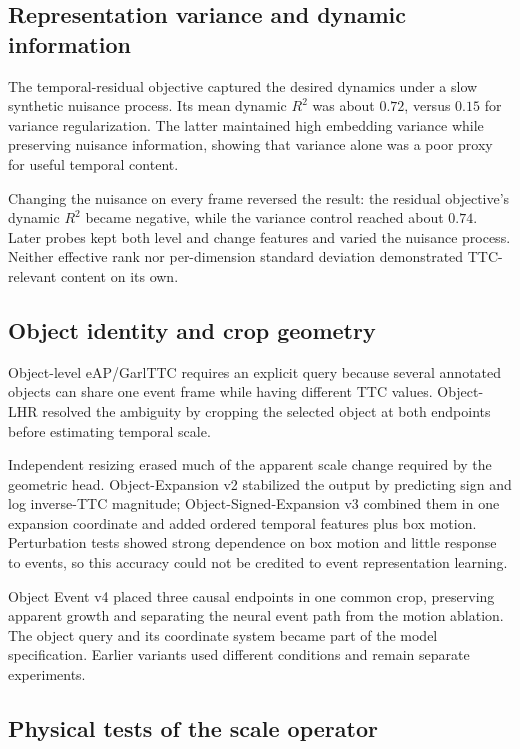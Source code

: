 \subsection{Representation variance and dynamic information}

The temporal-residual objective captured the desired dynamics under a slow synthetic nuisance process. Its mean dynamic $R^2$ was about $0.72$, versus $0.15$ for variance regularization. The latter maintained high embedding variance while preserving nuisance information, showing that variance alone was a poor proxy for useful temporal content.

Changing the nuisance on every frame reversed the result: the residual objective's dynamic $R^2$ became negative, while the variance control reached about $0.74$. Later probes kept both level and change features and varied the nuisance process. Neither effective rank nor per-dimension standard deviation demonstrated TTC-relevant content on its own. 

\subsection{Object identity and crop geometry}

Object-level eAP/GarlTTC requires an explicit query because several annotated objects can share one event frame while having different TTC values. Object-LHR resolved the ambiguity by cropping the selected object at both endpoints before estimating temporal scale.

Independent resizing erased much of the apparent scale change required by the geometric head. Object-Expansion v2 stabilized the output by predicting sign and log inverse-TTC magnitude; Object-Signed-Expansion v3 combined them in one expansion coordinate and added ordered temporal features plus box motion. Perturbation tests showed strong dependence on box motion and little response to events, so this accuracy could not be credited to event representation learning.

Object Event v4 placed three causal endpoints in one common crop, preserving apparent growth and separating the neural event path from the motion ablation. The object query and its coordinate system became part of the model specification. Earlier variants used different conditions and remain separate experiments.

\subsection{Physical tests of the scale operator}

